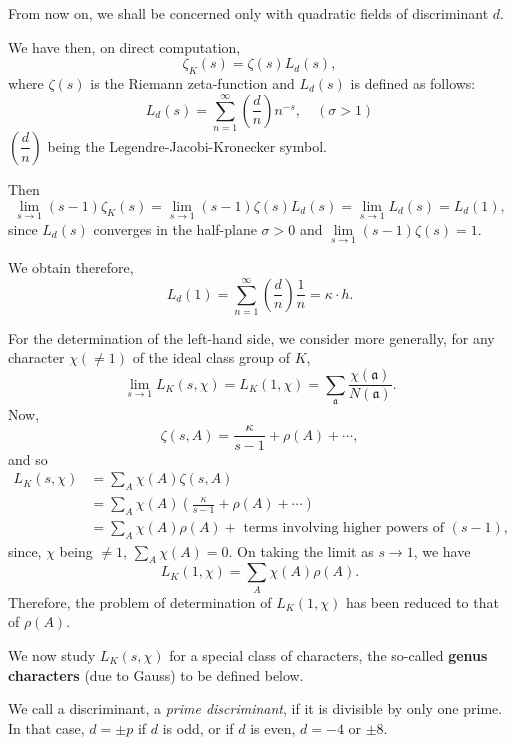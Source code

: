 From now on, we shall be concerned only with quadratic fields of
discriminant $d$.

We have then, on direct computation,
\begin{equation*}
\zeta_{K}(s)=\zeta(s)L_{d}(s),\tag{63}\label{63}
\end{equation*}
where $\zeta(s)$ is the Riemann zeta-function and $L_{d}(s)$ is
defined as follows:
$$
L_{d}(s)=\sum^{\infty}_{n=1}\left(\frac{d}{n}\right)n^{-s},\quad
(\sigma >1)
$$
$\left(\dfrac{d}{n}\right)$ being the Legendre-Jacobi-Kronecker
symbol. 

Then
$$
\lim\limits_{s\to 1}(s-1)\zeta_{K}(s)=\lim\limits_{s\to
  1}(s-1)\zeta(s)L_{d}(s)=\lim\limits_{s\to 1}L_{d}(s)=L_{d}(1),
$$
since $L_{d}(s)$ converges in the half-plane $\sigma>0$ and
$\lim\limits_{s\to 1}(s-1)\zeta(s)=1$.

We obtain therefore,
\begin{equation*}
L_{d}(1)=\sum^{\infty}_{n=1}\left(\frac{d}{n}\right)\frac{1}{n}=\kappa\cdot
h.\tag{64}\label{64} 
\end{equation*}

For the determination of the left-hand side, we consider more
generally, for any character $\chi(\neq 1)$ of the ideal class group
of $K$,
$$
\lim\limits_{s\to
  1}L_{K}(s,\chi)=L_{K}(1,\chi)=\sum_{\mathfrak{a}}\frac{\chi(\mathfrak{a})}{N(\mathfrak{a})}. 
$$
Now,\pageoriginale
$$
\zeta(s,A)=\frac{\kappa}{s-1}+\rho(A)+\cdots,
$$
and so
\begin{align*}
L_{K}(s,\chi) &= \sum_{A}\chi(A)\zeta(s,A)\\
&= \sum_{A}\chi(A)\left(\frac{\kappa}{s-1}+\rho(A)+\cdots\right)\\
&= \sum_{A}\chi(A)\rho(A)+\text{ terms involving higher powers of } (s-1),
\end{align*}
since, $\chi$ being $\neq 1$, $\sum\limits_{A}\chi(A)=0$. On taking
the limit as $s\to 1$, we have
\begin{equation*}
L_{K}(1,\chi)=\sum_{A}\chi(A)\rho(A).\tag{65}\label{65}
\end{equation*}
Therefore, the problem of determination of $L_{K}(1,\chi)$ has been
reduced to that of $\rho(A)$.

We now study $L_{K}(s,\chi)$ for a special class of characters, the
so-called {\bf genus characters} (due to Gauss) to be defined below.

We call a discriminant, a {\em prime discriminant}, if it is divisible
by only one prime. In that case, $d=\pm p$ if $d$ is odd, or if $d$ is
even, $d=-4$ or $\pm 8$.

